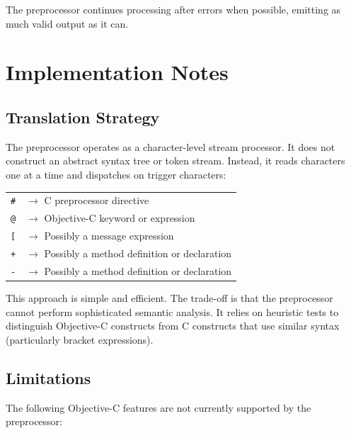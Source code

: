 \documentclass[11pt,twoside]{article}
\begin{document}
The preprocessor continues processing after errors when possible,
emitting as much valid output as it can.

\newpage
\section{Implementation Notes}

\subsection{Translation Strategy}

The preprocessor operates as a character-level stream processor.  It
does not construct an abstract syntax tree or token stream.  Instead, it
reads characters one at a time and dispatches on trigger characters:

\medskip
\noindent
\begin{tabular}{ll}
{\tt \#} & $\rightarrow$ C preprocessor directive \\
{\tt @} & $\rightarrow$ Objective-C keyword or expression \\
{\tt [} & $\rightarrow$ Possibly a message expression \\
{\tt +} & $\rightarrow$ Possibly a method definition or declaration \\
{\tt -} & $\rightarrow$ Possibly a method definition or declaration \\
\end{tabular}

This approach is simple and efficient.  The trade-off is that the
preprocessor cannot perform sophisticated semantic analysis.  It relies
on heuristic tests to distinguish Objective-C constructs from C
constructs that use similar syntax (particularly bracket expressions).

\subsection{Limitations}

The following Objective-C features are not currently supported by the
preprocessor:
\end{document}
